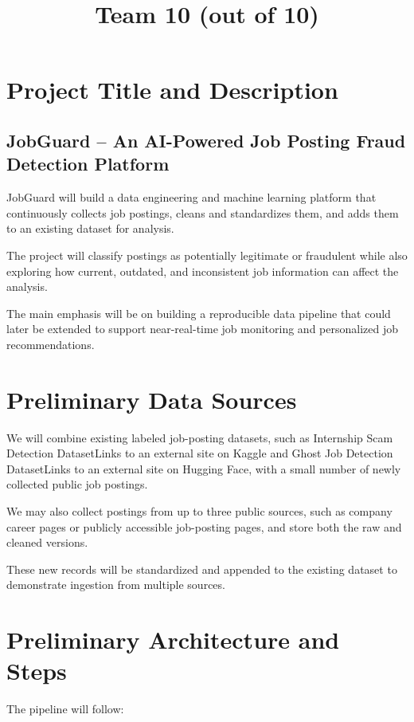 \documentclass{article}
\title{Team 10 (out of 10)}
\begin{document}
\maketitle

\section{Project Title and Description}

\subsection{JobGuard – An AI-Powered Job Posting Fraud Detection Platform}

JobGuard will build a data engineering and machine learning platform that continuously 
collects job postings, cleans and standardizes them, and adds them to an existing dataset for analysis.

The project will classify postings as potentially legitimate or fraudulent while also exploring how 
current, outdated, and inconsistent job information can affect the analysis.

The main emphasis will be on building a reproducible data pipeline that could later be extended to 
support near-real-time job monitoring and personalized job recommendations.

\section{Preliminary Data Sources}

We will combine existing labeled job-posting datasets, such as Internship Scam Detection 
DatasetLinks to an external site on Kaggle and Ghost Job Detection DatasetLinks to an external site 
on Hugging Face, with a small number of newly collected public job postings.

We may also collect postings from up to three public sources, such as company career pages or publicly 
accessible job-posting pages, and store both the raw and cleaned versions.

These new records will be standardized and appended to the existing dataset to demonstrate ingestion from multiple sources.

\section{Preliminary Architecture and Steps}

The pipeline will follow:
\end{document}

